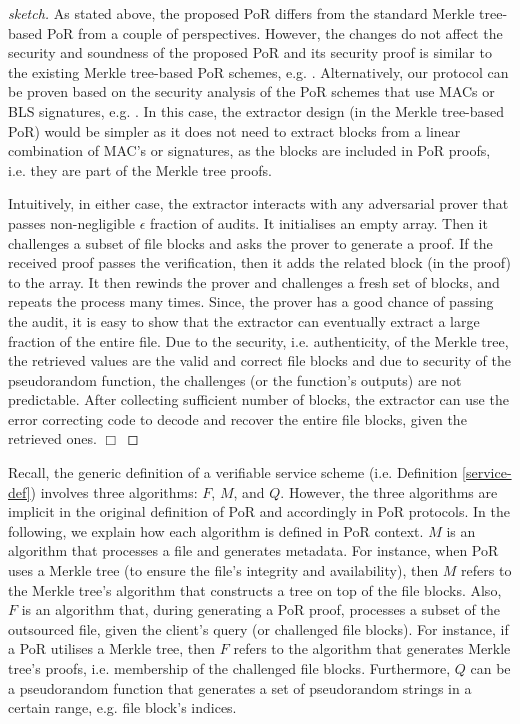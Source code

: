  \begin{proof}[sketch]
 As stated above, the proposed PoR differs from the standard Merkle tree-based PoR from a couple of perspectives. However, the changes do not affect the security and soundness of the proposed PoR and its security proof is similar to the existing Merkle tree-based PoR schemes, e.g. \cite{DBLP:conf/ccs/HaleviHPS11,MillerPermacoin,DBLP:journals/iacr/JuelsK07}. Alternatively, our protocol can be proven based on the security analysis of the PoR schemes that use  MACs or BLS signatures, e.g. \cite{DBLP:conf/asiacrypt/ShachamW08}. In this case, the extractor design (in the Merkle tree-based PoR)  would be simpler as it does not need to extract blocks from a linear combination of MAC's or signatures, as the  blocks are included in PoR proofs, i.e. they are part of the Merkle tree proofs. 
 
 Intuitively, in either case, the extractor interacts with any adversarial prover that passes non-negligible $\epsilon$ fraction of audits. It initialises an empty array. Then it  challenges a subset of file blocks and asks the prover to generate a proof.  If the received proof passes the verification, then it adds the related block (in the proof) to the array. It then rewinds the prover and challenges a fresh set of blocks, and repeats the process  many times. Since, the prover has a good chance of passing the audit, it is easy to show that the extractor can eventually extract a large fraction of the entire file. Due to the security, i.e. authenticity, of the Merkle tree, the retrieved values are the valid and correct file blocks and due to security of the pseudorandom function, the challenges (or the function's outputs) are not predictable. After collecting sufficient number of blocks, the extractor can use the error correcting code to decode and recover the entire file blocks, given the retrieved ones. 
 \hfill\(\Box\)\end{proof}
   
   \begin{remark}
   Recall,  the generic definition of a verifiable service scheme (i.e. Definition \ref{service-def}) involves three algorithms: $F$, $M$, and $Q$. However, the three algorithms are implicit in the original definition of  PoR and accordingly in  PoR protocols. In the following, we explain how each algorithm is defined in PoR context.  $M$ is an algorithm that processes a file and generates metadata. For instance, when PoR uses a Merkle tree (to ensure the file's integrity and availability), then $M$ refers to the Merkle tree's algorithm that constructs a tree on top of the file blocks. Also,  $F$ is an algorithm that, during generating a PoR proof, processes a subset of the outsourced file, given the client's query (or challenged file blocks). For instance, if a PoR  utilises a Merkle tree, then $F$ refers to the algorithm that generates Merkle tree's proofs, i.e.  membership of the challenged file blocks. Furthermore, $Q$ can be  a pseudorandom function that generates a set of pseudorandom strings in a certain range, e.g. file block's indices.   
   \end{remark}



















